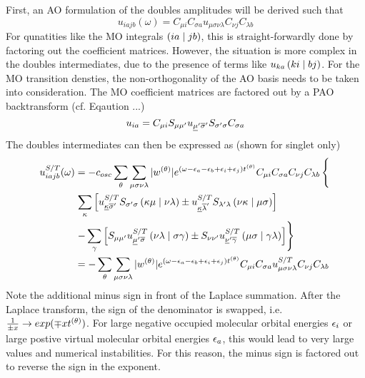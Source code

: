 First, an AO formulation of the doubles amplitudes will be derived such that
\begin{equation}
u_{iajb}(\omega) = C_{\mu i} C_{\sigma a} u_{\mu\sigma\nu\lambda} C_{\nu j} C_{\lambda b}
\end{equation}
\noindent For qunatities like the MO integrals $\left( ia \mid jb \right)$, this is straight-forwardly done by factoring out the coefficient matrices. However, the situation is more complex in the doubles intermediates, due to the presence of terms like $u_{ka}\left( ki \mid bj \right)$. For the MO transition densties, the non-orthogonality of the AO basis needs to be taken into consideration. The MO coefficient matrices are factored out by a PAO backtransform (cf. Eqaution ...)
\begin{equation}
u_{ia} = C_{\mu i} S_{\mu\mu'} u_{\underline{\mu}'\overline{\sigma}'} S_{\sigma'\sigma} C_{\sigma a}
\end{equation}
The doubles intermediates can then be expressed as (shown for singlet only)
\begin{equation}
\begin{split}
u_{iajb}^{S/T}(\omega) &= - c_{osc} \sum_{\theta} \sum_{\mu\sigma\nu\lambda} |w^{(\theta)}| e^{\left(\omega - \epsilon_a - \epsilon_b + \epsilon_i + \epsilon_j\right)t^{(\theta)}} C_{\mu i} C_{\sigma a} C_{\nu j} C_{\lambda b} \left\lbrace \vphantom{\sum_i} \right. \\
&\left. \sum_{\kappa} \left[ u^{S/T}_{\underline{\kappa}\overline{\sigma}'} S_{\sigma'\sigma} \left( \kappa \mu \mid \nu\lambda \right) \pm u^{S/T}_{\underline{\kappa}\overline{\lambda}'} S_{\lambda'\lambda} \left( \nu\kappa \mid \mu\sigma \right) \right] \right. \\
&\left. - \sum_{\gamma} \left[ S_{\mu\mu'} u^{S/T}_{\underline{\mu}'\overline{\sigma}} \left( \nu\lambda \mid \sigma\gamma \right) \pm S_{\nu\nu'} u^{S/T}_{\underline{\nu}'\overline{\gamma}} \left( \mu\sigma \mid \gamma\lambda \right) \right]   \right\rbrace \\
&= - \sum_{\theta} \sum_{\mu\sigma\nu\lambda} |w^{(\theta)}| e^{\left(\omega - \epsilon_a - \epsilon_b + \epsilon_i + \epsilon_j\right)t^{(\theta)}} C_{\mu i} C_{\sigma a} u_{\mu\sigma\nu\lambda}^{S/T} C_{\nu j} C_{\lambda b}
\end{split}
\end{equation}
\noindent Note the additional minus sign in front of the Laplace summation. After the Laplace transform, the sign of the denominator is swapped, i.e. $\frac{1}{\pm x} \rightarrow exp(\mp x t^{(\theta)})$. For large negative occupied molecular orbital energies $\epsilon_i$ or large postive virtual molecular orbital energies $\epsilon_a$, this would lead to very large values and numerical instabilities. For this reason, the minus sign is factored out to reverse the sign in the exponent. 

